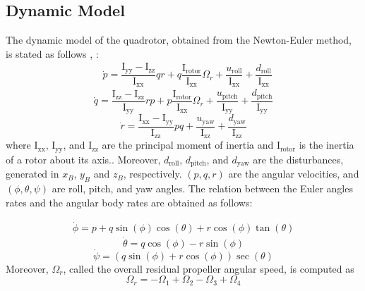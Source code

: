 \documentclass[conference]{IEEEtran}
\begin{document}
\subsection{Dynamic Model}
\noindent The dynamic model of the quadrotor, obtained from the Newton-Euler method, is stated as follows \cite{b15}, \cite{b16}:
\begin{equation}
	\begin{split}
		&\dot p = \dfrac{\mathrm{I}_{\text{yy}} - \mathrm{I}_{\text{zz}}}{\mathrm{I}_{\text{xx}}} qr + q \dfrac{\mathrm{I}_{\text{rotor}}}{\mathrm{I}_{\text{xx}}}\Omega_r + \dfrac{u_{\text{roll}}}{\mathrm{I}_{\text{xx}}} + \dfrac{d_{\text{roll}}}{\mathrm{I}_{\text{xx}}}
	\end{split}
\end{equation}
\begin{equation}
	\dot q = \dfrac{\mathrm{I}_{\text{zz}} - \mathrm{I}_{\text{zz}}}{\mathrm{I}_{\text{yy}}} rp + p \dfrac{\mathrm{I}_{\text{rotor}}}{\mathrm{I}_{\text{xx}}}\Omega_r + \dfrac{u_{\text{pitch}}}{\mathrm{I}_{\text{yy}}} + \dfrac{d_{\text{pitch}}}{\mathrm{I}_{\text{yy}}}
\end{equation}
\begin{equation}
	\dot r = \dfrac{\mathrm{I}_{\text{xx}} - \mathrm{I}_{\text{yy}}}{\mathrm{I}_{\text{zz}}} pq  +  \dfrac{u_{\text{yaw}}}{\mathrm{I}_{\text{zz}}} + \dfrac{d_{\text{yaw}}}{\mathrm{I}_{\text{zz}}}
\end{equation}
where $\mathrm{I}_{\text{xx}}$, $\mathrm{I}_{\text{yy}}$, and $\mathrm{I}_{\text{zz}}$ are the principal moment of inertia and $\mathrm{I}_{\text{rotor}}$ is the inertia of a rotor about its axis.. Moreover, $d_{\text{roll}}$, $d_{\text{pitch}}$, and $d_{\text{yaw}}$ are the disturbances, generated in $x_B$, $y_B$ and $z_B$, respectively. $(p, q, r)$ are the angular velocities, and $(\phi, \theta, \psi)$ are roll, pitch, and yaw angles. The relation between the Euler angles rates and the angular body rates are obtained as follows:

\begin{equation}
	\begin{split}
		\dot\phi = p + q\sin(\phi)\cos(\theta) + r\cos(\phi)\tan(\theta)
	\end{split}
\end{equation}
\begin{equation}
	\dot \theta = q\cos(\phi) - r\sin(\phi)
\end{equation}
\begin{equation}
	\dot\psi = (q\sin(\phi) + r\cos(\phi))\sec(\theta) 
\end{equation}
Moreover, $\Omega_r$, called the overall residual propeller angular speed, is computed as
\begin{equation}
	\Omega_r = -\Omega_1 + \Omega_2 - \Omega_3 + \Omega_4
\end{equation}
\end{document}
